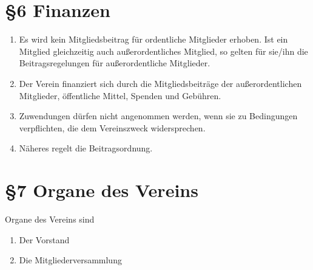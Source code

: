 \documentclass[11pt,ngerman]{article}
\begin{document}
\section*{§6 Finanzen}
\begin{enumerate}
	\item Es wird kein Mitgliedsbeitrag für ordentliche Mitglieder erhoben. Ist ein Mitglied gleichzeitig auch außerordentliches Mitglied, so gelten für sie/ihn die Beitragsregelungen für außerordentliche Mitglieder.
	\item  Der Verein finanziert sich durch die Mitgliedsbeiträge der außerordentlichen Mitglieder, öffentliche Mittel, Spenden und Gebühren.
	\item  Zuwendungen dürfen nicht angenommen werden, wenn sie zu Bedingungen verpflichten, die dem Vereinszweck widersprechen.
	\item Näheres regelt die Beitragsordnung.
\end{enumerate}




\section*{§7 Organe des Vereins}
Organe des Vereins sind
\begin{enumerate}
 \item Der Vorstand
 \item Die Mitgliederversammlung
\end{enumerate}
\end{document}
